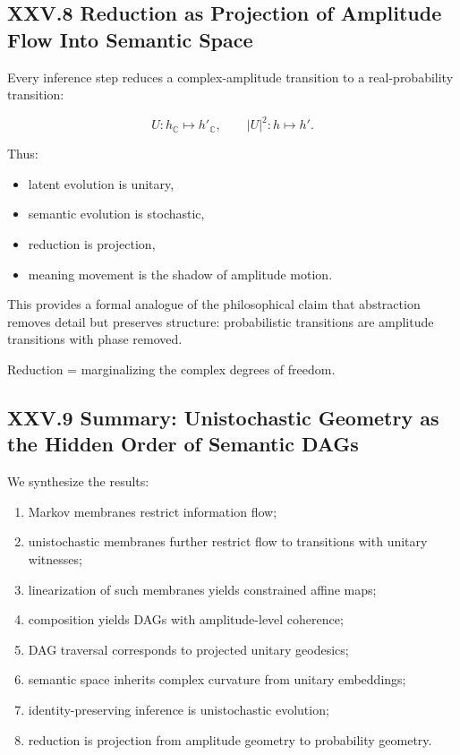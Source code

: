 \documentclass[12pt,letterpaper]{article}
\begin{document}
\subsection{XXV.8 Reduction as Projection of Amplitude Flow Into Semantic Space}

Every inference step reduces a complex-amplitude transition to a real-probability transition:

\[
U : h_{\mathbb{C}} \mapsto h'_{\mathbb{C}}, \qquad
|U|^2 : h \mapsto h'.
\]

Thus:

\begin{itemize}
    \item latent evolution is unitary,
    \item semantic evolution is stochastic,
    \item reduction is projection,
    \item meaning movement is the shadow of amplitude motion.
\end{itemize}

This provides a formal analogue of the philosophical claim that abstraction removes detail but preserves structure: probabilistic transitions are amplitude transitions with phase removed.

Reduction = marginalizing the complex degrees of freedom.

\subsection{XXV.9 Summary: Unistochastic Geometry as the Hidden Order of Semantic DAGs}

We synthesize the results:

\begin{enumerate}
    \item Markov membranes restrict information flow;  
    \item unistochastic membranes further restrict flow to transitions with unitary witnesses;
    \item linearization of such membranes yields constrained affine maps;
    \item composition yields DAGs with amplitude-level coherence;
    \item DAG traversal corresponds to projected unitary geodesics;
    \item semantic space inherits complex curvature from unitary embeddings;
    \item identity-preserving inference is unistochastic evolution;
    \item reduction is projection from amplitude geometry to probability geometry.
\end{enumerate}
\end{document}
